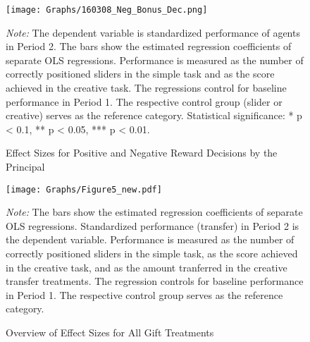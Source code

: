 \newpage


\begin{figure}[H]
\caption{Effect Sizes for Positive and Negative Reward Decisions by the Principal}
\begin{center}
\texttt{[image: Graphs/160308\_Neg\_Bonus\_Dec.png]}
\label{fig:Neg_Bonus_Dec}
	\begin{minipage}{0.8\textwidth}
	\footnotesize
	\vspace{5mm}
	{\it Note:} The dependent variable is standardized performance of agents in Period 2. The bars show the estimated regression coefficients of separate OLS regressions. Performance is measured as the number of correctly positioned sliders in the simple task and as the score achieved in the creative task. The regressions control for baseline performance in Period 1. The respective control group (slider or creative) serves as the reference category. Statistical significance: * p < 0.1, ** p < 0.05, *** p < 0.01. 
	\end{minipage}
\end{center}
\end{figure}





\newpage
\begin{figure}[H]
\caption{Overview of Effect Sizes for All Gift Treatments}
\begin{center}
\texttt{[image: Graphs/Figure5\_new.pdf]}
\label{fig:gift_treatments}
	\begin{minipage}{0.75\textwidth}
	\footnotesize
	\vspace{3mm}
	{\it Note:} The bars show the estimated regression coefficients of separate OLS regressions. Standardized performance (transfer) in Period 2 is the dependent variable. Performance is measured as the number of correctly positioned sliders in the simple  task,  as the score achieved in the creative task, and as the amount tranferred in the creative transfer treatments. The regression controls for baseline performance in Period 1. The respective control group serves as the reference category.
	\end{minipage}
\end{center}
\end{figure}




